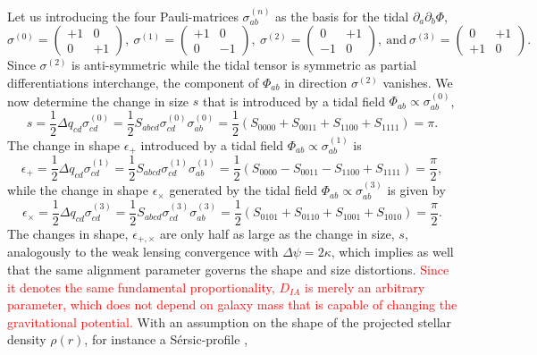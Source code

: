 \documentclass[a4paper,fleqn,usenatbib]{mnras}
\newcommand\BG[1]{\textcolor{red}{#1}}
\begin{document}
Let us introducing the four Pauli-matrices $\sigma^{(n)}_{ab}$ as the basis for the tidal $\partial_a\partial_b\Phi$,
\begin{equation}
\sigma^{(0)} = \left(
\begin{array}{cc}
+1 & 0 \\ 0 & +1
\end{array}
\right),~
\sigma^{(1)} = \left(
\begin{array}{cc}
+1 & 0 \\ 0 & -1
\end{array}
\right),~
\sigma^{(2)} = \left(
\begin{array}{cc}
0 & +1 \\ -1 & 0
\end{array}
\right),
\mathrm{~and~}
\sigma^{(3)} = \left(
\begin{array}{cc}
0 & +1 \\ +1 & 0
\end{array}
\right).
\end{equation}
Since $\sigma^{(2)}$ is anti-symmetric while the tidal tensor is symmetric as partial differentiations interchange, the component of $\Phi_{ab}$ in direction $\sigma^{(2)}$ vanishes. We now determine the change in size $s$ that is introduced by a tidal field $\Phi_{ab}\propto\sigma_{ab}^{(0)}$,
\begin{equation}
s = 
\frac{1}{2}\Delta q_{cd}\sigma^{(0)}_{cd} = 
\frac{1}{2}S_{abcd}\sigma^{(0)}_{cd}\sigma^{(0)}_{ab} = 
\frac{1}{2}\left(S_{0000} + S_{0011} + S_{1100} + S_{1111}\right) = 
\pi.
\end{equation}
The change in shape $\epsilon_+$ introduced by a tidal field $\Phi_{ab}\propto\sigma^{(1)}_{ab}$ is
\begin{equation}
\epsilon_+ = 
\frac{1}{2}\Delta q_{cd}\sigma^{(1)}_{cd} = 
\frac{1}{2}S_{abcd}\sigma^{(1)}_{cd}\sigma^{(1)}_{ab} = 
\frac{1}{2}\left(S_{0000} - S_{0011} - S_{1100} + S_{1111}\right) =
\frac{\pi}{2},
\end{equation}
while the change in shape $\epsilon_\times$ generated by the tidal field $\Phi_{ab}\propto\sigma^{(3)}_{ab}$ is given by
\begin{equation}
\epsilon_\times = 
\frac{1}{2}\Delta q_{cd}\sigma^{(3)}_{cd} =
\frac{1}{2}S_{abcd}\sigma^{(3)}_{cd}\sigma^{(3)}_{ab} = 
\frac{1}{2}\left(S_{0101} + S_{0110} + S_{1001} + S_{1010}\right) = 
\frac{\pi}{2}.
\end{equation}
The changes in shape, $\epsilon_{+,\times}$ are only half as large as the change in size, $s$, analogously to the weak lensing convergence with $\Delta\psi = 2\kappa$, which implies as well that the same alignment parameter governs the shape and size distortions. \BG{Since it denotes the same fundamental proportionality, $D_{IA}$ is merely an arbitrary parameter, which does not depend on galaxy mass that is capable of changing the gravitational potential.} With an assumption on the shape of the projected stellar density $\rho(r)$, for instance a S{\'e}rsic-profile \citep{sersic_influence_1963, graham_concise_2005},
\end{document}
